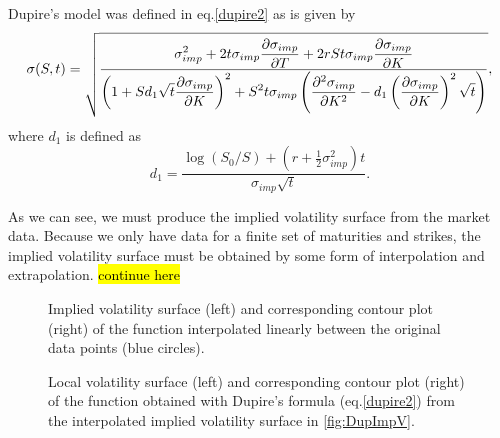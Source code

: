 Dupire's model was defined in eq.\eqref{dupire2} as is given by
\begin{equation}
\sigma(S,t)=\sqrt{\frac{\displaystyle\sigma_{imp}^2+2t\sigma_{imp}\pdv{\sigma_{imp}}{T}+2rSt\sigma_{imp}\pdv{\sigma_{imp}}{K}}{\displaystyle\left(1+Sd_1\sqrt{t}\pdv{\sigma_{imp}}{K}\right)^2+S^2t\sigma_{imp}\left(\pdv{^2\sigma_{imp}}{K^2}-d_1\left(\pdv{\sigma_{imp}}{K}\right)^2\sqrt{t}\right)}},
\end{equation}
\noindent where $d_1$ is defined as
\begin{equation}
d_1=\frac{\log(S_0/S)+\left(r+\frac{1}{2}\sigma_{imp}^2\right)t}{\sigma_{imp}\sqrt{t}}.
\end{equation}

As we can see, we must produce the implied volatility surface from the market data. Because we only have data for a finite set of maturities and strikes, the implied volatility surface must be obtained by some form of interpolation and extrapolation. \hl{continue here}

\begin{figure}[H]
  \begin{subfigmatrix}{2}
  \end{subfigmatrix}
    \caption[Implied volatility surface and corresponding contour plot of the function interpolated linearly between the original data points.]{Implied volatility surface (left) and corresponding contour plot (right) of the function interpolated linearly between the original data points (blue circles).}\label{fig:DupImpV}
\end{figure}   


\begin{figure}[H]
  \begin{subfigmatrix}{2}
  \end{subfigmatrix}
    \caption[Local volatility surface and corresponding contour plot of the function obtained with Dupire's formula from the interpolated implied volatility surface.]{Local volatility surface (left) and corresponding contour plot (right) of the function obtained with Dupire's formula (eq.\eqref{dupire2}) from the interpolated implied volatility surface in \autoref{fig:DupImpV}.}\label{fig:DupLocVol}
\end{figure}   


